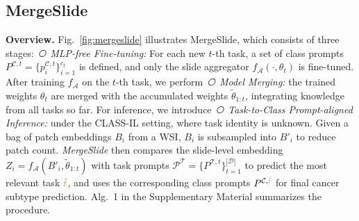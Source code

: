 \documentclass[10pt,twocolumn,letterpaper]{article}
\begin{document}
\subsection{MergeSlide}

\noindent\textbf{Overview.} {Fig.~\ref{fig:mergeslide} illustrates MergeSlide, which consists of three stages: \textit{\textcircled{} MLP-free Fine-tuning:} For each new $t$-th task, a set of class prompts $P^{\mathcal{C},t} = \{p^{\mathcal{C},t}_i\}_{i=1}^{c_t}$ is defined, and only the slide aggregator ${f}_{\mathcal{A}}(\cdot,\theta_t)$ is fine-tuned. After training $f_{\mathcal{A}}$ on the $t$-th task, we perform \textit{\textcircled{} Model Merging:} the trained weights $\theta_t$ are merged with the accumulated weights $\tilde{\theta}_{1:t}$, integrating knowledge from all tasks so far. For inference, we introduce \textit{\textcircled{} Task-to-Class Prompt-aligned Inference:} under the CLASS-IL setting, where task identity is unknown. Given a bag of patch embeddings $B_i$ from a WSI, $B_i$ is subsampled into $B'_i$ to reduce patch count. \textit{MergeSlide} then compares the slide-level embedding $Z_i =f_{\mathcal{A}}(B'_i,\tilde{\theta}_{1:t})$ with task prompts $\mathcal{P}^\mathcal{T} = \{P^{\mathcal{T},t}\}_{t=1}^{|\mathcal{D}|}$ to predict the most relevant task $\textcolor{orange}{\hat{t}}$, and uses the corresponding class prompts $P^{\mathcal{C}, \textcolor{orange}{\hat{t}}}$ for final cancer subtype prediction. Alg.~1 in the Supplementary Material summarizes the procedure.}
\end{document}
